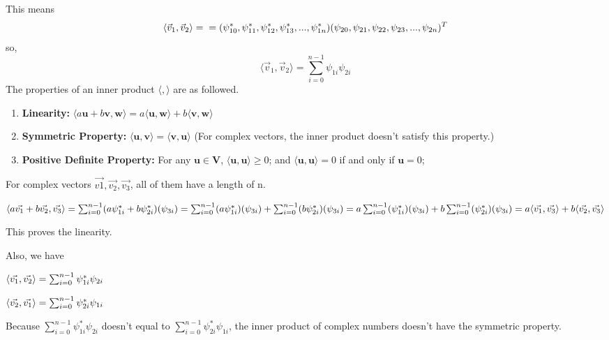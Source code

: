 \documentclass{article}
\begin{document}
\begin{enumerate}
          This means
          \[
              \langle \vec{v}_1,\vec{v}_2 \rangle=\\=(\psi_{10}^*,\psi_{11}^*,\psi_{12}^*,\psi_{13}^*,...,\psi_{1n}^*)(\psi_{20},\psi_{21},\psi_{22},\psi_{23},...,\psi_{2n})^T
          \]
          so,
          \[\langle \vec{v}_1,\vec{v}_2 \rangle=\sum_{i=0}^{n-1}\psi_{1i}\psi_{2i}\]
          The properties of an inner product $\langle,\rangle$ are as followed\cite{ref1}.
          \begin{enumerate}
              \item \textbf{Linearity:} $\langle a\mathbf{u}+b\mathbf{v},\mathbf{w}\rangle=a\langle \mathbf{u,w}\rangle+b\langle \mathbf{v,w}\rangle$
              \item \textbf{Symmetric Property: }$\langle \mathbf{u,v}\rangle=\langle \mathbf{v,u}\rangle$ (For  complex vectors, the inner product doesn't satisfy this property.)
              \item \textbf{Positive Definite Property: } For any $\mathbf{u\in V}$, $\langle \mathbf{u,u}\rangle\geq0$;
                    and $\langle \mathbf{u,u}\rangle=0$ if and only if $\mathbf{u}=0$;
          \end{enumerate}
          For complex vectors $\vec{v1},\vec{v_2},\vec{v_3}$, all of them have a length of n.

          $\langle a\vec{v_1}+b\vec{v_2},\vec{v_3}\rangle
              \\=\sum_{i=0}^{n-1}(a\psi_{1i}^*+b\psi_{2i}^*)(\psi_{3i})
              \\=\sum_{i=0}^{n-1}(a\psi_{1i}^*)(\psi_{3i})+\sum_{i=0}^{n-1}(b\psi_{2i}^*)(\psi_{3i})
              \\=a\sum_{i=0}^{n-1}(\psi_{1i}^*)(\psi_{3i})+b\sum_{i=0}^{n-1}(\psi_{2i}^*)(\psi_{3i})
              \\=a\langle\vec{v_1},\vec{v_3}\rangle+b\langle\vec{v_2},\vec{v_3}\rangle
          $

          This proves the linearity.

          Also, we have

          $\langle \vec{v_1},\vec{v_2}\rangle
              \\=\sum_{i=0}^{n-1}\psi_{1i}^*\psi_{2i}$

          $
              \langle\vec{v_2},\vec{v_1}\rangle
              \\=\sum_{i=0}^{n-1}\psi_{2i}^*\psi_{1i}
          $

          Because $\sum_{i=0}^{n-1}\psi_{1i}^*\psi_{2i}$ doesn't equal to $\sum_{i=0}^{n-1}\psi_{2i}^*\psi_{1i}$, the inner product of complex numbers doesn't have the symmetric property.


\end{enumerate}
\end{document}
